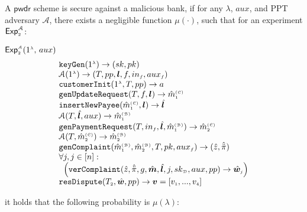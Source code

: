 \begin{definition}\label{def-a::Security-against-malicious-bank} A $\mathsf{pwdr}$ scheme is secure against a malicious bank, if for any  $\lambda$,  $ {aux}$, and   PPT adversary $\mathcal{A}$, there exists a negligible function $\mu(\cdot)$, such that for an experiment $\mathsf{Exp}_{\scriptscriptstyle 2}^{\mathcal{A}}$:
%
{\small{
\begin{center}
\begin{mybox}[colback=white,  width=80mm, height=56mm, left=-1mm, drop fuzzy shadow southwest]{$\mathsf{Exp}_{\scriptscriptstyle 2}^{\scriptscriptstyle\mathcal{A}}(1^{\scriptscriptstyle\lambda}\text{, }  {aux})$}
$$
  \begin{array}{l}
%
 \mathtt{keyGen}(1^{\st\lambda})\rightarrow (sk,pk) \\
%
\mathcal{A}(1^{\st \lambda})\rightarrow (T, pp, \bm{l}, f,  in_{\st f}, {aux}_{\st f}) \\
%
\mathtt{customerInit} (1^{\st \lambda}, T, pp)\rightarrow a \\  
%
\mathtt{genUpdateRequest}(T, f, {\bm l})\rightarrow \hat m^{\st\mathcal{(C)}}_{\st 1} \\
%
\mathtt{insertNewPayee}(\hat{m}^{\st\mathcal{(C)}}_{\st 1}, {\bm l})\rightarrow  \hat{\bm l} \\ 
%
\mathcal{A}(T, \hat{\bm l}, {aux})\rightarrow \hat m^{\st\mathcal{(B)}}_{\st1} \\
%
\mathtt{genPaymentRequest}(T, in_{\st f}, \hat{\bm{l}}, \hat m^{\st\mathcal{(B)}}_{\st1})\rightarrow \hat m^{\st\mathcal{(C)}}_{\st2} \\ 
%
\mathcal{A}(T, \hat m^{\st\mathcal{(C)}}_{\st2})\rightarrow \hat m^{\st\mathcal{(B)}}_{\st2} \\
%
\mathtt{genComplaint}(\hat m^{\st\mathcal{(B)}}_{\st 1}, \hat m^{\st\mathcal{(B)}}_{\st2}, T, pk, {aux}_{\st f})\rightarrow (\hat z, \hat{\ddot \pi}) \\
%
 \forall j, j\in [n]:\\
\hspace{2mm}\Big(\mathtt{verComplaint}( \hat z, \hat{\ddot{\pi}}, g, \hat{\bm m}, \hat{\bm{l}}, j, sk_{\st\mathcal D}, aux, pp)\rightarrow \hat{\bm{w}}_{\st j}%
\Big)
\\
%
\mathtt{resDispute}(T_{\st 2}, \hat {\bm w}, pp)\rightarrow \bm v=[v_{\st 1},...,   v_{\st 4}]\\
   \end{array} 
$$
\end{mybox}
\end{center}
}}
%
it holds that the following probability is $\mu(\lambda)$:


\end{definition}
